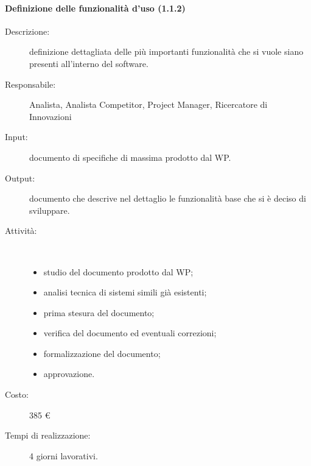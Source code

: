 \paragraph{Definizione delle funzionalit\`{a} d'uso (1.1.2)}
\begin{description}
\item[Descrizione:] definizione dettagliata delle pi\`{u} importanti funzionalit\`{a} che si vuole siano presenti all'interno del software.
\item[Responsabile:] Analista, Analista Competitor, Project Manager, Ricercatore di Innovazioni
\item[Input:] documento di specifiche di massima prodotto dal WP.
\item[Output:] documento che descrive nel dettaglio le funzionalità base che si è deciso di sviluppare.
\item[Attività:]\mbox{}\\[-1.5\baselineskip]
	\begin{itemize}
	\item studio del documento prodotto dal WP;
	\item analisi tecnica di sistemi simili gi\`{a} esistenti;
	\item prima stesura del documento;
	\item verifica del documento ed eventuali correzioni;
	\item formalizzazione del documento;
	\item approvazione.
	\end{itemize}
\item[Costo:] 385 \euro{}
\item[Tempi di realizzazione:] 4 giorni lavorativi.
\end{description}

